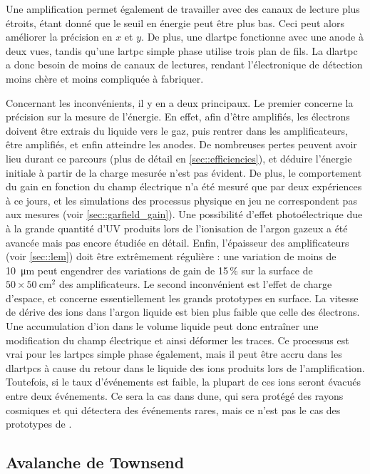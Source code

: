       Une amplification permet également de travailler avec des canaux de lecture plus étroits, étant donné que le seuil en énergie peut être plus bas. Ceci peut alors améliorer la précision en $x$ et $y$. De plus, une \gls{dlartpc} fonctionne avec une anode à deux vues, tandis qu'une \gls{lartpc} simple phase utilise trois plan de fils. La \gls{dlartpc} a donc besoin de moins de canaux de lectures, rendant l'électronique de détection moins chère et moins compliquée à fabriquer.

      Concernant les inconvénients, il y en a deux principaux. Le premier concerne la précision sur la mesure de l'énergie. En effet, afin d'être amplifiés, les électrons doivent être extrais du liquide vers le gaz, puis rentrer dans les amplificateurs, être amplifiés, et enfin atteindre les anodes. De nombreuses pertes peuvent avoir lieu durant ce parcours (plus de détail en \autoref{sec::efficiencies}), et déduire l'énergie initiale à partir de la charge mesurée n'est pas évident. De plus, le comportement du gain en fonction du champ électrique n'a été mesuré que par deux expériences à ce jours, et les simulations des processus physique en jeu ne correspondent pas aux mesures (voir \autoref{sec::garfield_gain}). Une possibilité d'effet photoélectrique due à la grande quantité d'UV produits lors de l'ionisation de l'argon gazeux a été avancée mais pas encore étudiée en détail. Enfin, l'épaisseur des amplificateurs (voir \autoref{sec::lem}) doit être extrêmement régulière : une variation de moins de \SI{10}{\micro\meter} peut engendrer des variations de gain de 15\,\% sur la surface de $50\times\SI{50}{\centi\meter\squared}$ des amplificateurs. Le second inconvénient est l'effet de charge d'espace, et concerne essentiellement les grands prototypes en surface. La vitesse de dérive des ions dans l'argon liquide est bien plus faible que celle des électrons. Une accumulation d'ion dans le volume liquide peut donc entraîner une modification du champ électrique et ainsi déformer les traces. Ce processus est vrai pour les \glspl{lartpc} simple phase également, mais il peut être accru dans les \glspl{dlartpc} à cause du retour dans le liquide des ions produits lors de l'amplification\cite{Romero2016}. Toutefois, si le taux d'événements est faible, la plupart de ces ions seront évacués entre deux événements. Ce sera la cas dans \gls{dune}, qui sera protégé des rayons cosmiques et qui détectera des événements rares, mais ce n'est pas le cas des prototypes de \protodp{}.


    \subsection{Avalanche de Townsend}\label{sec::townsend}
      
